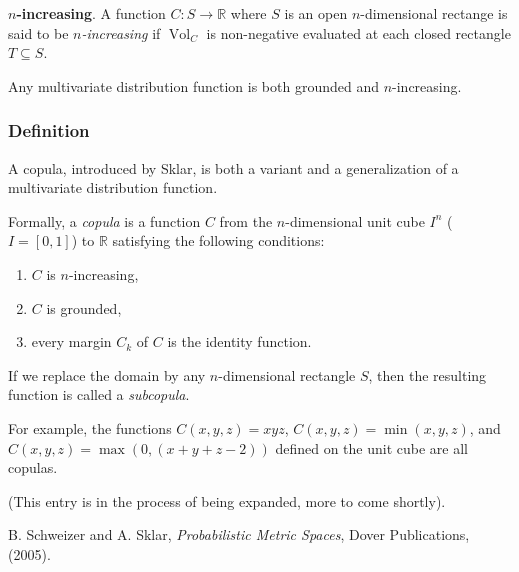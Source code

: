 \documentclass[12pt]{article}
\begin{document}
\textbf{$n$-increasing}.  A function $C:S\to\mathbb{R}$ where $S$ is an open $n$-dimensional rectange is said to be \emph{$n$-increasing} if $\operatorname{Vol}_C$ is non-negative evaluated at each closed rectangle $T\subseteq S$.

Any multivariate distribution function is both grounded and $n$-increasing.

\subsubsection*{Definition}

A copula, introduced by Sklar, is both a variant and a generalization of a multivariate distribution function.

Formally, a \emph{copula} is a function $C$ from the $n$-dimensional unit cube $I^n$ ($I=[0,1]$) to $\mathbb{R}$ satisfying the following conditions:
\begin{enumerate}
\item $C$ is $n$-increasing,
\item $C$ is grounded,
\item every margin $C_k$ of $C$ is the identity function.
\end{enumerate}

If we replace the domain by any $n$-dimensional rectangle $S$, then the resulting function is called a \emph{subcopula}.

For example, the functions $C(x,y,z)=xyz$, $C(x,y,z)=\min(x,y,z)$, and $C(x,y,z)=\max(0,(x+y+z-2))$ defined on the unit cube are all copulas.

(This entry is in the process of being expanded, more to come shortly).

\begin{thebibliography}{8}
 B. Schweizer and A. Sklar, {\em Probabilistic Metric Spaces}, Dover Publications, (2005).
\end{thebibliography}
\end{document}

